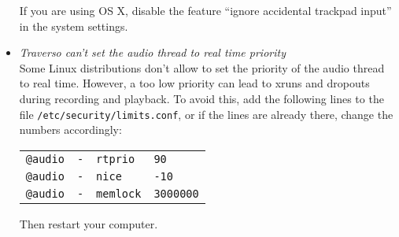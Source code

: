 \begin{itemize}
 If you are using OS X, disable the feature ``ignore accidental trackpad input'' in the system settings.

 \item \textit{Traverso can't set the audio thread to real time priority}\\
 Some Linux distributions don't allow to set the priority of the audio thread to real time. However, a too low priority can lead to xruns and dropouts during recording and playback. To avoid this, add the following lines to the file \texttt{/etc/security/limits.conf}, or if the lines are already there, change the numbers accordingly:

\begin{tabular}{llll}
\texttt{@audio} & \texttt{-} & \texttt{rtprio} & \texttt{90}\\
\texttt{@audio} & \texttt{-} & \texttt{nice} & \texttt{-10}\\
\texttt{@audio} & \texttt{-} & \texttt{memlock} & \texttt{3000000}\\
\end{tabular}

Then restart your computer.

\end{itemize}


